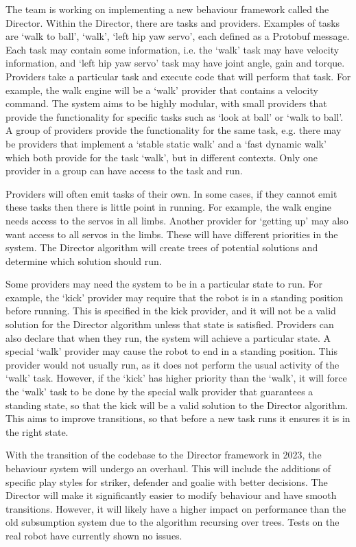 \documentclass{llncs}
\begin{document}
The team is working on implementing a new behaviour framework called the Director. Within the Director, there are tasks and providers. Examples of tasks are `walk to ball', `walk', `left hip yaw servo', each defined as a Protobuf message. Each task may contain some information, i.e. the `walk' task may have velocity information, and `left hip yaw servo' task may have joint angle, gain and torque. Providers take a particular task and execute code that will perform that task. For example, the walk engine will be a `walk' provider that contains a velocity command. The system aims to be highly modular, with small providers that provide the functionality for specific tasks such as `look at ball' or `walk to ball'. A group of providers provide the functionality for the same task, e.g. there may be providers that implement a `stable static walk' and a `fast dynamic walk' which both provide for the task `walk', but in different contexts. Only one provider in a group can have access to the task and run. 

Providers will often emit tasks of their own. In some cases, if they cannot emit these tasks then there is little point in running. For example, the walk engine needs access to the servos in all limbs. Another provider for `getting up' may also want access to all servos in the limbs. These will have different priorities in the system. The Director algorithm will create trees of potential solutions and determine which solution should run. 

Some providers may need the system to be in a particular state to run. For example, the `kick' provider may require that the robot is in a standing position before running. This is specified in the kick provider, and it will not be a valid solution for the Director algorithm unless that state is satisfied. Providers can also declare that when they run, the system will achieve a particular state. A special `walk' provider may cause the robot to end in a standing position. This provider would not usually run, as it does not perform the usual activity of the `walk' task. However, if the `kick' has higher priority than the `walk', it will force the `walk' task to be done by the special walk provider that guarantees a standing state, so that the kick will be a valid solution to the Director algorithm. This aims to improve transitions, so that before a new task runs it ensures it is in the right state.

With the transition of the codebase to the Director framework in 2023, the behaviour system will undergo an overhaul. This will include the additions of specific play styles for striker, defender and goalie with better decisions. The Director will make it significantly easier to modify behaviour and have smooth transitions. However, it will likely have a higher impact on performance than the old subsumption system due to the algorithm recursing over trees. Tests on the real robot have currently shown no issues. 
\end{document}
